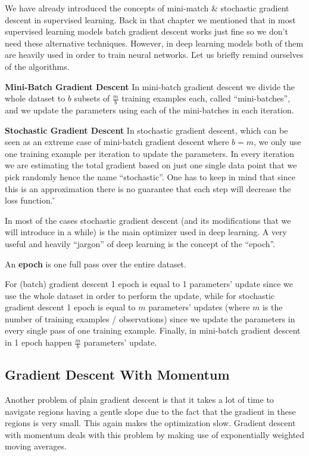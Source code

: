 We have already introduced the concepts of mini-match \& stochastic gradient descent in supervised learning. Back in
that chapter we mentioned that in most supervised learning models batch gradient descent works just fine so we don't
need these alternative techniques. However, in deep learning models both of them are heavily used in order to train
neural networks. \v

Let us briefly remind ourselves of the algorithms.
\bit
\item \textbf{Mini-Batch Gradient Descent} In mini-batch gradient descent we divide the whole dataset to $b$ subsets
of $\frac{m}{b}$ training examples each, called ``mini-batches'', and we update the parameters using each of the
mini-batches in each iteration.
\item \textbf{Stochastic Gradient Descent} In stochastic gradient descent, which can be seen as an extreme case of
mini-batch gradient descent where $b=m$, we only use one training example per iteration to update the parameters. In
every iteration we are estimating the total gradient based on just one single data point that we pick randomly hence
the name ``stochastic''. One has to keep in mind that since this is an approximation there is no guarantee that each
step will decrease the loss function. \v
\eit

In most of the cases stochastic gradient descent (and its modifications that we will introduce in a while) is the
main optimizer used in deep learning. A very useful and heavily ``jargon'' of deep learning is the concept of the
``epoch''.

\bd [Epoch]
An \textbf{epoch} is one full pass over the entire dataset.
\ed

For (batch) gradient descent 1 epoch is equal to 1 parameters' update since we use the whole dataset in order to
perform the update, while for stochastic gradient descent 1 epoch is equal to $m$ parameters' updates (where $m$ is
the number of training examples / observations) since we update the parameters in every single pass of one training
example. Finally, in mini-batch gradient descent in 1 epoch happen $\frac{m}{b}$ parameters' update.

\subsection{Gradient Descent With Momentum}

Another problem of plain gradient descent is that it takes a lot of time to navigate regions having a gentle slope
due to the fact that the gradient in these regions is very small. This again makes the optimization slow. Gradient
descent with momentum deals with this problem by making use of exponentially weighted moving averages.

